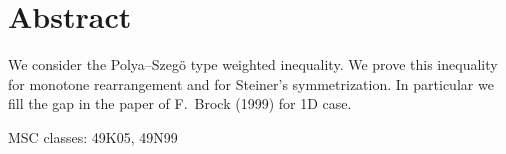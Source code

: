 \section*{Abstract}

We consider the Polya--Szeg\"o type weighted inequality.
We prove this inequality for monotone rearrangement and for Steiner's symmetrization.
In particular we fill the gap in the paper of F.~Brock (1999) for 1D case.

MSC classes: 49K05, 49N99